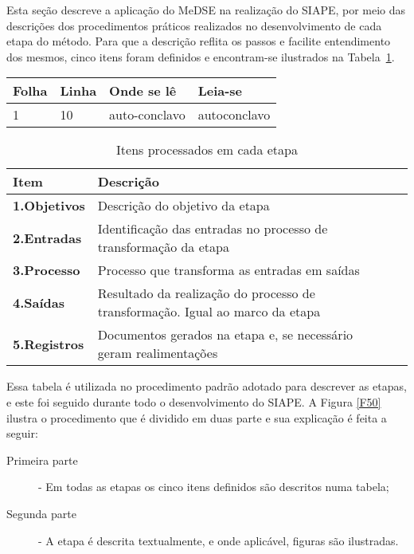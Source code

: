 Esta seção descreve a aplicação do MeDSE na realização do SIAPE, por meio das descrições dos procedimentos práticos realizados no desenvolvimento de cada etapa do método. Para que a descrição reflita os passos e facilite entendimento dos mesmos,  cinco itens foram definidos e encontram-se ilustrados na Tabela~\ref{T2}. 


\begin{table}[htb]
	\center
	\footnotesize
	\begin{tabular}{|p{1.4cm}|p{1cm}|p{3cm}|p{3cm}|}
		\hline
		\textbf{Folha} & \textbf{Linha}  & \textbf{Onde se lê}  & \textbf{Leia-se}  \\
		\hline
		1 & 10 & auto-conclavo & autoconclavo\\
		\hline
	\end{tabular}
\end{table}

\begin{table}[h]
	\centering
	\caption{Itens processados em cada etapa}
	\begin{tabular}{|l| p{13.5cm}| c| c| } \hline
		\textbf{ Item} 	   & \textbf {Descrição}	 \\ \hline
		\textbf{1.Objetivos}   & Descrição do objetivo da etapa \\ \hline
		\textbf{2.Entradas}	   & Identificação das entradas no processo de transformação da etapa  \\ \hline
		\textbf{3.Processo }    & Processo que transforma as entradas em saídas \\ \hline
		\textbf{4.Saídas}		  & Resultado da realização do processo de transformação. Igual ao marco da etapa\\ \hline
		\textbf{5.Registros}	 & Documentos gerados na etapa e, se necessário geram realimentações \\ \hline
	\end{tabular}
	\label{T2}
\end{table}

Essa tabela é utilizada no procedimento padrão adotado para descrever as etapas, e este foi seguido durante todo o desenvolvimento do SIAPE. A Figura \ref{F50} ilustra o procedimento que é dividido em duas parte e sua explicação é feita a seguir:

\begin{description}
	\item[Primeira parte] - Em todas as etapas os cinco itens definidos  são descritos numa tabela;
	\item[Segunda parte] - A etapa é descrita textualmente, e onde aplicável, figuras são ilustradas. 
\end{description}


